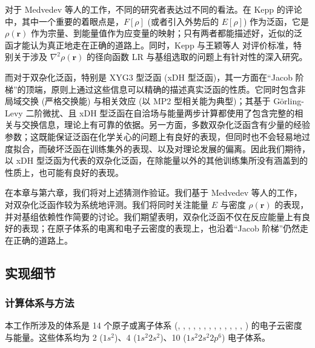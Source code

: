 对于 Medvedev 等人的工作，不同的研究者表达过不同的看法。在 Kepp 的评论\cite{Kepp-Kepp.S.2017}中，其中一个重要的着眼点是，$F[\rho]$ (或者引入外势后的 $E[\rho]$) 作为泛函，它是 $\rho(\bm{r})$ 作为宗量、到能量值作为应变量的映射；只有两者都能描述好，近似的泛函才能认为真正地走在正确的道路上。同时，Kepp\cite{Kepp-Kepp.S.2017} 与王颖等人\cite{Wang-He.JCTC.2017} 对评价标准，特别关于涉及 $\nabla^2 \rho(\bm{r})$ 的径向函数 LR 与基组选取的问题上有针对性的深入研究。

而对于双杂化泛函，特别是 XYG3 型泛函 (xDH 型泛函)\cite{Zhang-Goddard.PNAS.2009}，其一方面在“Jacob 阶梯”的顶端，原则上通过这些信息可以精确的描述真实泛函的性质。它同时包含非局域交换 (严格交换能) 与相关效应 (以 MP2 型相关能为典型)；其基于 G\"orling-Levy 二阶微扰\cite{Goerling-Levy.PRB.1993, Goerling-Levy.PRA.1994}、且 xDH 型泛函在自洽场与能量两步计算都使用了包含完整的相关与交换信息，理论上有可靠的依据。另一方面，多数双杂化泛函含有少量的经验参数；这既能保证泛函在化学关心的问题上有良好的表现，但同时也不会轻易地过度拟合，而破坏泛函在训练集外的表现、以及对理论发展的偏离。因此我们期待，以 xDH 型泛函为代表的双杂化泛函，在除能量以外的其他训练集所没有涵盖到的性质上，也可能有良好的表现。

在本章与第六章，我们将对上述猜测作验证。我们基于 Medvedev 等人的工作\cite{Medvedev-Lyssenko.S.2017}，对双杂化泛函作较为系统地评测。我们将同时关注能量 $E$ 与密度 $\rho(\bm{r})$ 的表现，并对基组依赖性作简要的讨论。我们期望表明，双杂化泛函不仅在反应能量上有良好的表现\cite{Su-Xu.WCMS.2016, Goerigk-Grimme.PCCP.2017, Zhang-Xu.JPCL.2021, Santra-Martin.JPCL.2021}；在原子体系的电离和电子云密度的表现上，也沿着“Jacob 阶梯”仍然走在正确的道路上。

\subsection{实现细节}

\subsubsection{计算体系与方法}

本工作所涉及的体系是 14 个原子或离子体系 (, , , , , , , , , , , , , ) 的电子云密度与能量。这些体系均为 2 ($1s^2$)、4 ($1s^2 2s^2$)、10 ($1s^2 2s^2 2p^6$) 电子体系。

